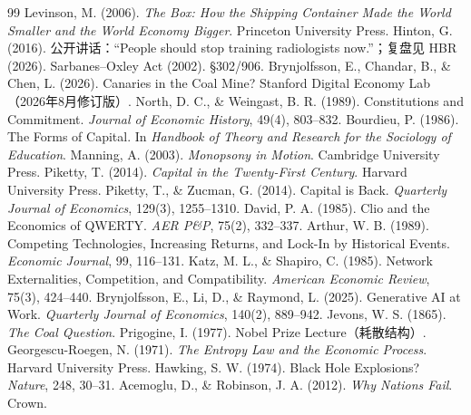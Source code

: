 \documentclass[11pt]{ctexart}
\begin{document}
\begin{thebibliography}{99}
 Levinson, M. (2006). \textit{The Box: How the Shipping Container Made the World Smaller and the World Economy Bigger}. Princeton University Press.
 Hinton, G. (2016). 公开讲话：“People should stop training radiologists now.”；复盘见 HBR (2026).
 Sarbanes--Oxley Act (2002). \S 302/906.
 Brynjolfsson, E., Chandar, B., \& Chen, L. (2026). Canaries in the Coal Mine? Stanford Digital Economy Lab（2026年8月修订版）.
 North, D. C., \& Weingast, B. R. (1989). Constitutions and Commitment. \textit{Journal of Economic History}, 49(4), 803--832.
 Bourdieu, P. (1986). The Forms of Capital. In \textit{Handbook of Theory and Research for the Sociology of Education}.
 Manning, A. (2003). \textit{Monopsony in Motion}. Cambridge University Press.
 Piketty, T. (2014). \textit{Capital in the Twenty-First Century}. Harvard University Press.
 Piketty, T., \& Zucman, G. (2014). Capital is Back. \textit{Quarterly Journal of Economics}, 129(3), 1255--1310.
 David, P. A. (1985). Clio and the Economics of QWERTY. \textit{AER P\&P}, 75(2), 332--337.
 Arthur, W. B. (1989). Competing Technologies, Increasing Returns, and Lock-In by Historical Events. \textit{Economic Journal}, 99, 116--131.
 Katz, M. L., \& Shapiro, C. (1985). Network Externalities, Competition, and Compatibility. \textit{American Economic Review}, 75(3), 424--440.
 Brynjolfsson, E., Li, D., \& Raymond, L. (2025). Generative AI at Work. \textit{Quarterly Journal of Economics}, 140(2), 889--942.
 Jevons, W. S. (1865). \textit{The Coal Question}.
 Prigogine, I. (1977). Nobel Prize Lecture（耗散结构）.
 Georgescu-Roegen, N. (1971). \textit{The Entropy Law and the Economic Process}. Harvard University Press.
 Hawking, S. W. (1974). Black Hole Explosions? \textit{Nature}, 248, 30--31.
 Acemoglu, D., \& Robinson, J. A. (2012). \textit{Why Nations Fail}. Crown.
\end{thebibliography}
\end{document}
